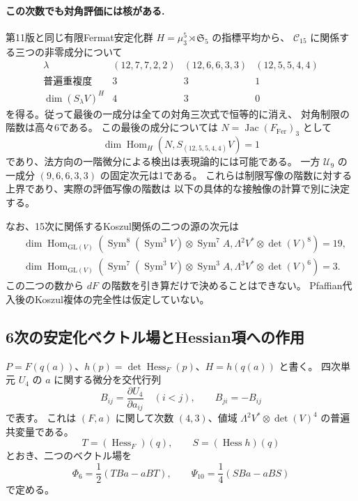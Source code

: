 \paragraph{この次数でも対角評価には核がある.}
第11版と同じ有限Fermat安定化群
$H=\mu_3^5\rtimes\mathfrak S_5$ の指標平均から、
$\mathcal C_{15}$ に関係する三つの非零成分について
\[
\begin{array}{c|ccc}
 \lambda&(12,7,7,2,2)&(12,6,6,3,3)&(12,5,5,4,4)\\\hline
 \text{普遍重複度}&3&3&1\\
 \dim(S_\lambda V)^H&4&3&0
\end{array}
\]
を得る。従って最後の一成分は全ての対角三次式で恒等的に消え、
対角制限の階数は高々6である。
この最後の成分については
$N=\operatorname{Jac}(F_{\mathrm{Fer}})_3$ として
\[
 \dim\operatorname{Hom}_H(N,S_{(12,5,5,4,4)}V)=1
\]
であり、法方向の一階微分による検出は表現論的には可能である。
一方 $\mathcal U_9$ の一成分 $(9,6,6,3,3)$ の固定次元は1である。
これらは制限写像の階数に対する上界であり、実際の評価写像の階数は
以下の具体的な接触像の計算で別に決定する。

なお、15次に関係するKoszul関係の二つの源の次元は
\[
\begin{split}
 &\dim\operatorname{Hom}_{\mathrm{GL}(V)}
 \left(\operatorname{Sym}^{8}(\operatorname{Sym}^3V)
       \otimes\operatorname{Sym}^{7}A,
       \Lambda^2V^*\otimes\det(V)^8\right)=19,\\
 &\dim\operatorname{Hom}_{\mathrm{GL}(V)}
 \left(\operatorname{Sym}^{7}(\operatorname{Sym}^3V)
       \otimes\operatorname{Sym}^{3}A,
       \Lambda^3V^*\otimes\det(V)^6\right)=3.
\end{split}
\]
この二つの数から $dF$ の階数を引き算だけで決めることはできない。
Pfaffian代入後のKoszul複体の完全性は仮定していない。

\subsection{6次の安定化ベクトル場とHessian項への作用}
\label{subsec:v12-sixth-stabilizer}

$P=F(q(a))$、$h(p)=\det\operatorname{Hess}_F(p)$、$H=h(q(a))$ と書く。
四次単元 $U_4$ の $a$ に関する微分を交代行列
\[
 B_{ij}=\frac{\partial U_4}{\partial a_{ij}}\quad(i<j),\qquad
 B_{ji}=-B_{ij}
\]
で表す。
これは $(F,a)$ に関して次数 $(4,3)$、値域
$\Lambda^2V^*\otimes\det(V)^4$ の普遍共変量である。
\[
 T=(\operatorname{Hess}_F)(q),\qquad
 S=(\operatorname{Hess}h)(q)
\]
とおき、二つのベクトル場を
\begin{equation}\label{eq:v12-sixth-tenth-fields}
 \Phi_6=\frac12(TBa-aBT),\qquad
 \Psi_{10}=\frac14(SBa-aBS)
\end{equation}
で定める。

